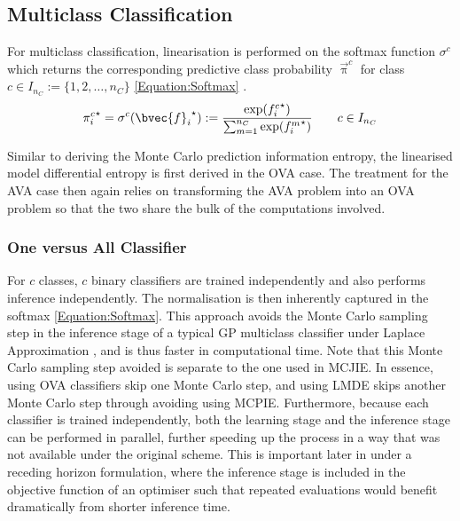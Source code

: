		\subsection{Multiclass Classification}
		\label{InformativeSeafloorExploration:LMDE:Multiclass}
		
			For multiclass classification, linearisation is performed on the softmax function $\sigma^{c}$ which returns the corresponding predictive class probability $\vec{\uppi}^{c}$ for class $c \in I_{n_{C}} := \{1, 2, \dots, n_{C}\}$ \eqref{Equation:Softmax} \citep{GaussianProcessForMachineLearning}. \begin{equation}
				{\pi^{c}_{i}}^{\star} = \sigma^{c}({\bvec{f}_{i}}^{\star}) := \frac{\exp({f^{c}_{i}}^{\star})}{\sum_{m = 1}^{n_{C}} \exp({f^{m}_{i}}^{\star})} \qquad c \in I_{n_{C}}
			\label{Equation:Softmax}
			\end{equation}
			
			Similar to deriving the Monte Carlo prediction information entropy, the linearised model differential entropy is first derived in the OVA case. The treatment for the AVA case then again relies on transforming the AVA problem into an OVA problem so that the two share the bulk of the computations involved.
			
			\subsubsection{One versus All Classifier}
			\label{InformativeSeafloorExploration:LMDE:Multiclass:OVA}
			
				For $c$ classes, $c$ binary classifiers are trained independently and also performs inference independently. The normalisation is then inherently captured in the softmax \eqref{Equation:Softmax}. This approach avoids the Monte Carlo sampling step in the inference stage of a typical GP multiclass classifier under Laplace Approximation \citep{GaussianProcessForMachineLearning}, and is thus faster in computational time. Note that this Monte Carlo sampling step avoided is separate to the one used in MCJIE. In essence, using OVA classifiers skip one Monte Carlo step, and using LMDE skips another Monte Carlo step through avoiding using MCPIE. Furthermore, because each classifier is trained independently, both the learning stage and the inference stage can be performed in parallel, further speeding up the process in a way that was not available under the original scheme. This is important later in under a receding horizon formulation, where the inference stage is included in the objective function of an optimiser such that repeated evaluations would benefit dramatically from shorter inference time.
				
